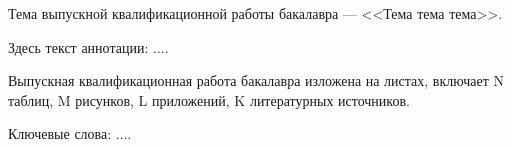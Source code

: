
Тема выпускной квалификационной работы бакалавра --- <<Тема тема тема>>.

Здесь текст аннотации: $\dots$.  

Выпускная квалификационная работа бакалавра изложена на \pageref{LastPage} листах, включает N таблиц, M рисунков, L приложений, K литературных источников.

Ключевые слова: $\dots$.

\clearpage